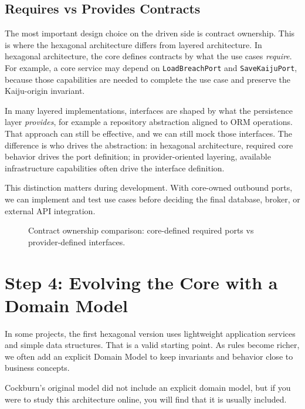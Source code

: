 \subsection{Requires vs Provides Contracts}
\label{sec:hexagonal_requires_vs_provides}

The most important design choice on the driven side is contract ownership. This is where the hexagonal architecture differs from layered architecture. In hexagonal architecture, the core defines contracts by what the use cases \textit{require}. For example, a core service may depend on \texttt{LoadBreachPort} and \texttt{SaveKaijuPort}, because those capabilities are needed to complete the use case and preserve the Kaiju-origin invariant.

In many layered implementations, interfaces are shaped by what the persistence layer \textit{provides}, for example a repository abstraction aligned to ORM operations. That approach can still be effective, and we can still mock those interfaces. The difference is who drives the abstraction: in hexagonal architecture, required core behavior drives the port definition; in provider-oriented layering, available infrastructure capabilities often drive the interface definition.

This distinction matters during development. With core-owned outbound ports, we can implement and test use cases before deciding the final database, broker, or external API integration.

\begin{figure}[htbp]
    \centering
    
    \caption{Contract ownership comparison: core-defined required ports vs provider-defined interfaces.}
    \label{fig:hexagonal_requires_vs_provides}
\end{figure}

\section{Step 4: Evolving the Core with a Domain Model}
\label{sec:hexagonal_step4}

In some projects, the first hexagonal version uses lightweight application services and simple data structures. That is a valid starting point. As rules become richer, we often add an explicit Domain Model to keep invariants and behavior close to business concepts.

Cockburn's original model did not include an explicit domain model, but if you were to study this architecture online, you will find that it is usually included.



